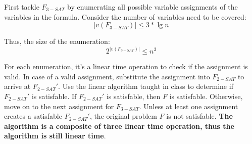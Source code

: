 \documentclass[12pt]{article}
\begin{document}
\begin{enumerate}
First tackle $F_{3-SAT}$ by enumerating all possible variable assignments of the variables in the formula. Consider the number of variables need to be covered:
\begin{equation}
| v(F_{3-SAT}) | \leq 3 * \lg{n}
\end{equation}

Thus, the size of the enumeration:
\begin{equation}
2^{| v(F_{3-SAT}) |} \leq n^{3}
\end{equation}

For each enumeration, it's a linear time operation to check if the assignment is valid. In case of a valid assignment, substitute the assignment into $F_{2-SAT}$ to arrive at $F_{2-SAT}'$. Use the linear algorithm taught in class to determine if $F_{2-SAT}'$ is satisfable. If $F_{2-SAT}'$ is satisfable, then $F$ is satisfable. Otherwise, move on to the next assignment for $F_{3-SAT}$. Unless at least one assignment creates a satisfable $F_{2-SAT}'$, the original problem $F$ is not satisfable. \textbf{The algorithm is a composite of three linear time operation, thus the algorithm is still linear time}.


\end{enumerate}
\end{document}
